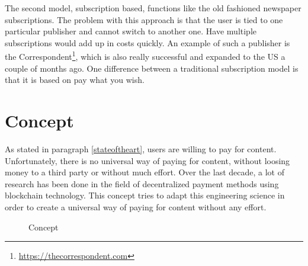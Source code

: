 \documentclass[a4paper]{article}
\begin{document}
The second model, subscription based, functions like the old fashioned newspaper subscriptions.  The problem with this approach is that the user is tied to one particular publisher and cannot switch to another one. Have multiple subscriptions would add up in costs quickly. An example of such a publisher is the Correspondent\footnote{\url{https://thecorrespondent.com}}, which is also really successful and expanded to the US a couple of months ago. One difference between a traditional subscription model is that it is based on pay what you wish.

\section {Concept}
As stated in paragraph \ref{stateoftheart}, users are willing to pay for content. Unfortunately, there is no universal way of paying for content, without loosing money to a third party or without much effort. Over the last decade, a lot of research has been done in the field of decentralized payment methods using blockchain technology. This concept tries to adapt this engineering science in order to create a universal way of paying for content without any effort. 



\begin{figure}[htbp]
	
	\caption{Concept}
\end{figure}
\end{document}
